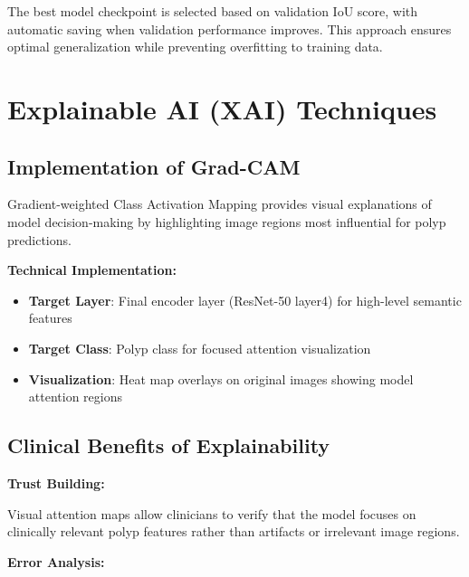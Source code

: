 \documentclass[a4paper,12pt]{report}
\begin{document}
The best model checkpoint is selected based on validation IoU score, with automatic saving when validation performance improves. This approach ensures optimal generalization while preventing overfitting to training data.


\section{Explainable AI (XAI) Techniques}

\subsection{Implementation of Grad-CAM}

Gradient-weighted Class Activation Mapping provides visual explanations of model decision-making by highlighting image regions most influential for polyp predictions.

\vspace{1em}

\noindent\textbf{\normalsize Technical Implementation:}
\vspace{0.5em}

\begin{itemize}
    \item \textbf{Target Layer}: Final encoder layer (ResNet-50 layer4) for high-level semantic features
    \item \textbf{Target Class}: Polyp class for focused attention visualization
    \item \textbf{Visualization}: Heat map overlays on original images showing model attention regions
\end{itemize}

\vspace{1em}

\subsection{Clinical Benefits of Explainability}

\noindent\textbf{\normalsize Trust Building:}
\vspace{0.5em}

Visual attention maps allow clinicians to verify that the model focuses on clinically relevant polyp features rather than artifacts or irrelevant image regions.

\vspace{1em}

\noindent\textbf{\normalsize Error Analysis:}
\vspace{0.5em}
\end{document}
